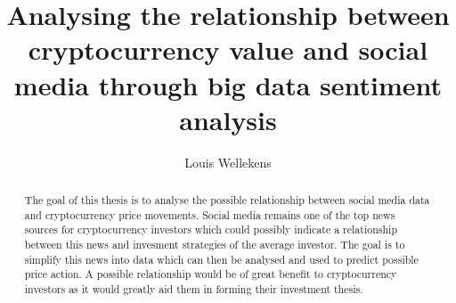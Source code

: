 \documentclass[english]{hogent-article}
\title{Analysing the relationship between cryptocurrency value and social media through big data sentiment analysis}
\author{Louis Wellekens}
\begin{document}
\begin{abstract}
  The goal of this thesis is to analyse the possible relationship between social media data and cryptocurrency price movements. Social media remains one of the top news sources for cryptocurrency investors which could possibly indicate a relationship between this news and invesment strategies of the average investor. The goal is to simplify this news into data which can then be analysed and used to predict possible price action. A possible relationship would be of great benefit to cryptocurrency investors as it would greatly aid them in forming their investment thesis.
\end{abstract}

\tableofcontents



\printbibliography[heading=bibintoc]
\end{document}

